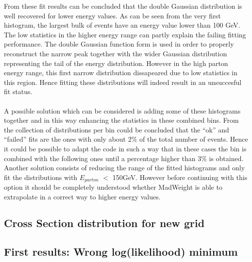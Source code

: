 From these fit results can be concluded that the double Gaussian distribution is well recovered for lower energy values. As can be seen from the very first histogram, the largest bulk of events have an energy value lower than 100 GeV. The low statistics in the higher energy range can partly explain the failing fitting performance. The double Gaussian function form is used in order to properly reconstruct the narrow peak together with the wider Gaussian distribution representing the tail of the energy distribution. However in the high parton energy range, this first narrow distribution dissapeared due to low statistics in this region. Hence fitting these distributions will indeed result in an unsuccesful fit status.\\
\\
A possible solution which can be considered is adding some of these histograms together and in this way enhancing the statistics in these combined bins. From the collection of distributions per bin could be concluded that the ``ok'' and ``failed'' fits are the ones with only about 2$\%$ of the total number of events. Hence it could be possible to adapt the code in such a way that in these cases the bin is combined with the following ones until a percentage higher than 3$\%$ is obtained.\\
Another solution consists of reducing the range of the fitted histograms and only fit the distributions with $E_{parton}$ $<$ 150GeV. However before continuing with this option it should be completely understood whether MadWeight is able to extrapolate in a correct way to higher energy values.

\newpage
\subsection{Cross Section distribution for new grid}

\subsection{First results: Wrong log(likelihood) minimum}

